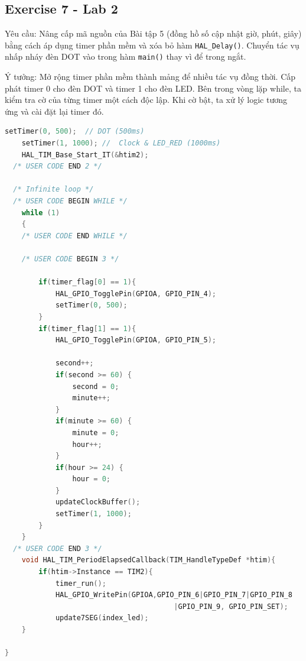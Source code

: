 \subsection{Exercise 7 - Lab 2}

Yêu cầu: Nâng cấp mã nguồn của Bài tập 5 (đồng hồ số cập nhật giờ, phút, giây) bằng cách áp dụng timer phần mềm và xóa bỏ hàm \texttt{HAL\_Delay()}. Chuyển tác vụ nhấp nháy đèn DOT vào trong hàm \texttt{main()} thay vì để trong ngắt.

Ý tưởng: Mở rộng timer phần mềm thành mảng để  nhiều tác vụ đồng thời. Cấp phát timer 0 cho đèn DOT và timer 1 cho đèn LED. Bên trong vòng lặp while, ta kiểm tra cờ của từng timer một cách độc lập. Khi cờ bật, ta xử lý logic tương ứng và cài đặt lại timer đó.

\begin{lstlisting}[language=C, caption={Phần code hiện thực}, label={lst:ex6_lab2}]
    setTimer(0, 500);  // DOT (500ms)
    setTimer(1, 1000); //  Clock & LED_RED (1000ms)
    HAL_TIM_Base_Start_IT(&htim2);
  /* USER CODE END 2 */

  /* Infinite loop */
  /* USER CODE BEGIN WHILE */
    while (1)
    {
    /* USER CODE END WHILE */

    /* USER CODE BEGIN 3 */

        if(timer_flag[0] == 1){
            HAL_GPIO_TogglePin(GPIOA, GPIO_PIN_4);
            setTimer(0, 500);
        }
        if(timer_flag[1] == 1){
            HAL_GPIO_TogglePin(GPIOA, GPIO_PIN_5);

            second++;
            if(second >= 60) {
                second = 0;
                minute++;
            }
            if(minute >= 60) {
                minute = 0;
                hour++;
            }
            if(hour >= 24) {
                hour = 0;
            }
            updateClockBuffer();
            setTimer(1, 1000);
        }
    }
  /* USER CODE END 3 */
    void HAL_TIM_PeriodElapsedCallback(TIM_HandleTypeDef *htim){
    	if(htim->Instance == TIM2){
    		timer_run();
    		HAL_GPIO_WritePin(GPIOA,GPIO_PIN_6|GPIO_PIN_7|GPIO_PIN_8
                                        |GPIO_PIN_9, GPIO_PIN_SET);
    		update7SEG(index_led);
	}

}
\end{lstlisting}


